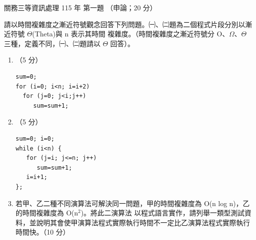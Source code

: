 \begin{pastexam}[label={px:gw3-115-ds-01}]{關務三等資訊處理 115 年 第一題}
（申論；20 分）

請以時間複雜度之漸近符號觀念回答下列問題。㈠、㈡題為二個程式片段分別以漸近符號 $\Theta$(Theta)與 n 表示其時間
複雜度。（時間複雜度之漸近符號分 O、$\Omega$、$\Theta$ 三種，定義不同，㈠、㈡題請以 $\Theta$ 回答）。
\begin{enumerate}[leftmargin=2.6em, labelsep=0.4em]
\item[㈠] （5 分）
\begin{verbatim}
sum=0;
for (i=0; i<n; i=i+2)
  for (j=0; j<i;j++)
     sum=sum+1;
\end{verbatim}
\item[㈡] （5 分）
\begin{verbatim}
sum=0; i=0;
while (i<n) {
   for (j=i; j<=n; j++)
      sum=sum+1;
   i=i+1;
};
\end{verbatim}
\item[㈢] 若甲、乙二種不同演算法可解決同一問題，甲的時間複雜度為 O(n log n)，乙的時間複雜度為 O(n$^2$)。將此二演算法
以程式語言實作，請列舉一類型測試資料，並說明其會使甲演算法程式實際執行時間不一定比乙演算法程式實際執行時間快。（10 分）
\end{enumerate}
\end{pastexam}

